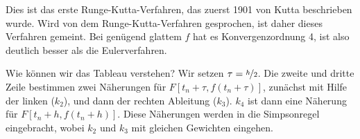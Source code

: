 Dies ist das erste Runge-Kutta-Verfahren, das zuerst 1901 von Kutta
beschrieben wurde. Wird von dem Runge-Kutta-Verfahren gesprochen, ist
daher dieses Verfahren gemeint. Bei genügend glattem $f$ hat es
Konvergenzordnung 4, ist also deutlich besser als die Eulerverfahren.

Wie können wir das Tableau verstehen?  Wir setzen
$\tau=\nicefrac{h}{2}$. Die zweite und dritte Zeile bestimmen zwei
Näherungen für $F[t_n+\tau, f(t_n+\tau)]$, zunächst mit Hilfe der
linken ($k_2$), und dann der rechten Ableitung ($k_3$). $k_4$ ist dann
eine Näherung für $F[t_n+h, f(t_n+h)]$. Diese Näherungen werden in die
Simpsonregel eingebracht, wobei $k_2$ und $k_3$ mit gleichen Gewichten
eingehen.







